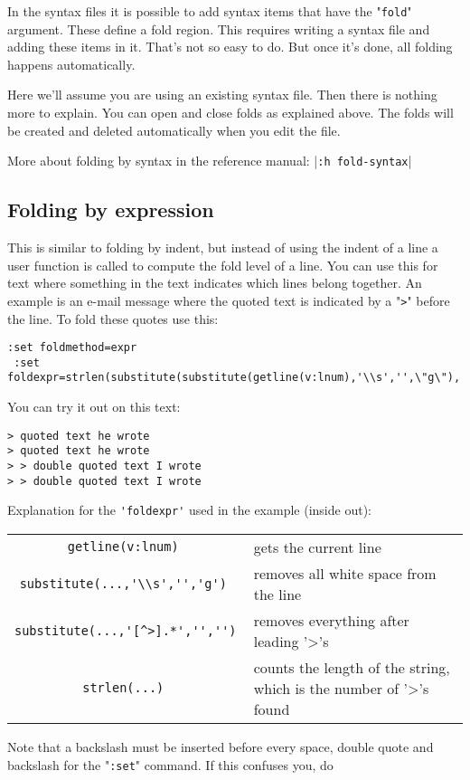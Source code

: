 In the syntax files it is possible to add syntax items that have the "\verb!fold!" argument.
These define a fold region.
This requires writing a syntax file and adding these items in it.
That's not so easy to do.
But once it's done, all folding happens automatically.

Here we'll assume you are using an existing syntax file.
Then there is nothing more to explain.
You can open and close folds as explained above.
The folds will be created and deleted automatically when you edit the file.

More about folding by syntax in the reference manual: |\verb!:h fold-syntax!|
\subsection{Folding by expression}
This is similar to folding by indent, but instead of using the indent of a line a user function is called to compute the fold level of a line.
You can use this for text where something in the text indicates which lines belong together.
An example is an e-mail message where the quoted text is indicated by a "\verb!>!" before the line.
To fold these quotes use this:

\begin{Verbatim}[samepage=true]
 :set foldmethod=expr
 :set foldexpr=strlen(substitute(substitute(getline(v:lnum),'\\s','',\"g\"),'[^>].*','',''))
\end{Verbatim}

You can try it out on this text:

\begin{Verbatim}[samepage=true]
> quoted text he wrote
> quoted text he wrote
> > double quoted text I wrote
> > double quoted text I wrote
\end{Verbatim}

Explanation for the \verb!'foldexpr'! used in the example (inside out):
\begin{center} \begin{tabular}{c l}
				\verb!getline(v:lnum) ! & gets the current line \\
				\verb!substitute(...,'\\s','','g') ! & removes all white space from the line \\
				\verb!substitute(...,'[^>].*','','') ! & removes everything after leading '>'s \\
				\verb!strlen(...) ! & counts the length of the string, which is the number of '>'s found \\
\end{tabular} \end{center}
Note that a backslash must be inserted before every space, double quote and backslash for the "\verb!:set!" command.
If this confuses you, do

